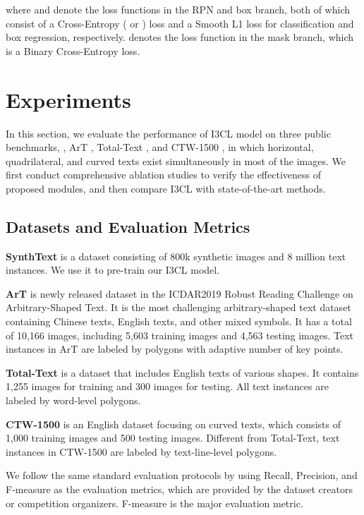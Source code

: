   


where  and  denote the loss functions in the RPN and box branch, both of which consist of a Cross-Entropy ( or ) loss  and a Smooth L1 loss  for classification and box regression, respectively.  denotes the loss function in the mask branch, which is a Binary Cross-Entropy loss.


\section{Experiments}
In this section, we evaluate the performance of I3CL model on three public benchmarks, , ArT \citep{icdar2019art}, Total-Text \citep{totaltext}, and CTW-1500 \citep{ctw1500}, in which horizontal, quadrilateral, and curved texts exist simultaneously in most of the images. We first conduct comprehensive ablation studies to verify the effectiveness of proposed modules, and then compare I3CL with state-of-the-art methods.

\subsection{Datasets and Evaluation Metrics}
\textbf{SynthText} \citep{synthtext} is a dataset consisting of 800k synthetic images and 8 million text instances. We use it to pre-train our I3CL model.

\textbf{ArT} \citep{icdar2019art} is newly released dataset in the ICDAR2019 Robust Reading Challenge on Arbitrary-Shaped Text. It is the most challenging arbitrary-shaped text dataset containing Chinese texts, English texts, and other mixed symbols. It has a total of 10,166 images, including 5,603 training images and 4,563 testing images. Text instances in ArT are labeled by polygons with adaptive number of key points.

\textbf{Total-Text} \citep{totaltext} is a dataset that includes English texts of various shapes. It contains 1,255 images for training and 300 images for testing. All text instances are labeled by word-level polygons. 

\textbf{CTW-1500} \citep{ctw1500} is an English dataset focusing on curved texts, which consists of 1,000 training images and 500 testing images. Different from Total-Text, text instances in CTW-1500 are labeled by text-line-level polygons.

We follow the same standard evaluation protocols by using Recall, Precision, and F-measure as the evaluation metrics, which are provided by the dataset creators or competition organizers. F-measure is the major evaluation metric.



